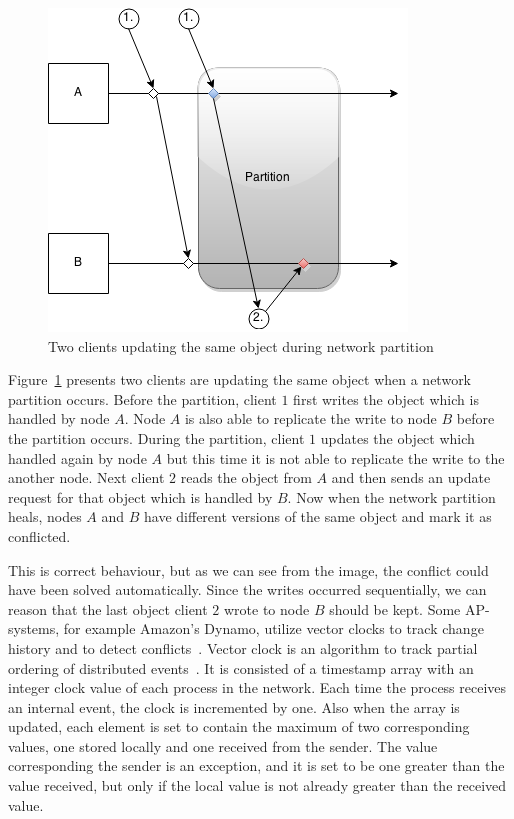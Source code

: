 \begin{figure}[h!]
  \centering
    \includegraphics[scale=0.7]{pictures/apexample.png}
  \caption{Two clients updating the same object during network partition}
\label{ap-example}
\end{figure}

Figure~\ref{ap-example} presents two clients are updating the same object when a
network partition occurs.  Before the partition, client \(1\) first writes the
object which is handled by node \(A\). Node \(A\) is also able to replicate the
write to node \(B\) before the partition occurs. During the partition, client
\(1\) updates the object which handled again by node \(A\) but this time it is
not able to replicate the write to the another node. Next client \(2\) reads the
object from \(A\) and then sends an update request for that object which is
handled by \(B\). Now when the network partition heals, nodes \(A\) and \(B\)
have different versions of the same object and mark it as conflicted.

This is correct behaviour, but as we can see from the image, the conflict could
have been solved automatically. Since the writes occurred sequentially, we can
reason that the last object client \(2\) wrote to node \(B\) should be kept.
Some AP-systems, for example Amazon's Dynamo, utilize vector clocks to track
change history and to detect conflicts~\cite{decandia2007dynamo}. Vector clock is
an algorithm to track partial ordering of distributed
events~\cite{fidge1987timestamps}. It is consisted of a timestamp array with an
integer clock value of each process in the network. Each time the process
receives an internal event, the clock is incremented by one. Also when the array
is updated, each element is set to contain the maximum of two corresponding
values, one stored locally and one received from the sender. The value
corresponding the sender is an exception, and it is set to be one greater than
the value received, but only if the local value is not already greater than the
received value.

